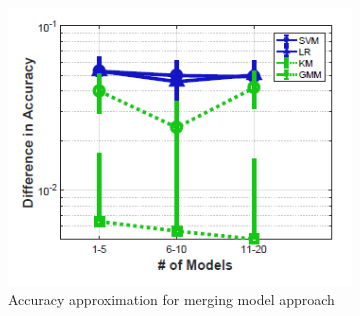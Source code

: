 \begin{figure}[h]
\begin{subfigure}{0.2\textwidth}
        \includegraphics[height = 1.2\textwidth, width=1.2\textwidth]{Figures/model_reuse_merge_model_accuracy.png}
    \caption{Accuracy approximation for merging model approach}
    \label{fig:model_reuse2}
    \end{subfigure}
    \hfill
    \begin{subfigure}{0.2\textwidth}

\end{subfigure}
\end{figure}
